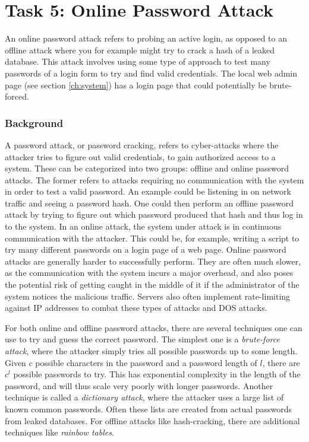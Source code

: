 \section{Task 5: Online Password Attack} \label{ch:pentesting:password}
An online password attack refers to probing an active login, as opposed to an offline attack where you for example might try to crack a hash of a leaked database. This attack involves using some type of approach to test many passwords of a login form to try and find valid credentials. The local web admin page (see section \ref{ch:system}) has a login page that could potentially be brute-forced.

\subsubsection{Background}
A password attack, or password cracking, refers to cyber-attacks where the attacker tries to figure out valid credentials, to gain authorized access to a system. These can be categorized into two groups: offline and online password attacks. The former refers to attacks requiring no communication with the system in order to test a valid password. An example could be listening in on network traffic and seeing a password hash. One could then perform an offline password attack by trying to figure out which password produced that hash and thus log in to the system. In an online attack, the system under attack is in continuous communication with the attacker. This could be, for example, writing a script to try many different passwords on a login page of a web page. Online password attacks are generally harder to successfully perform. They are often much slower, as the communication with the system incurs a major overhead, and also poses the potential risk of getting caught in the middle of it if the administrator of the system notices the malicious traffic. Servers also often implement rate-limiting against IP addresses to combat these types of attacks and DOS attacks.

For both online and offline password attacks, there are several techniques one can use to try and guess the correct password. The simplest one is a \textit{brute-force attack}, where the attacker simply tries all possible passwords up to some length. Given $c$ possible characters in the password and a password length of $l$, there are $c^l$ possible passwords to try. This has exponential complexity in the length of the password, and will thus scale very poorly with longer passwords. Another technique is called a \textit{dictionary attack}, where the attacker uses a large list of known common passwords. Often these lists are created from actual passwords from leaked databases. For offline attacks like hash-cracking, there are additional techniques like \textit{rainbow tables}.

